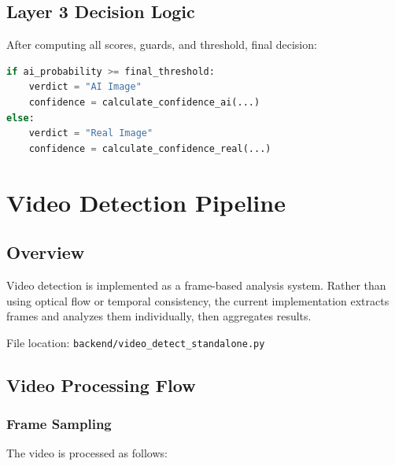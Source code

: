 \documentclass[12pt,a4paper]{book}
\begin{document}
\section{Layer 3 Decision Logic}

After computing all scores, guards, and threshold, final decision:

\begin{lstlisting}[language=Python]
if ai_probability >= final_threshold:
    verdict = "AI Image"
    confidence = calculate_confidence_ai(...)
else:
    verdict = "Real Image"
    confidence = calculate_confidence_real(...)
\end{lstlisting}

\chapter{Video Detection Pipeline}
\label{ch:video-detection}

\section{Overview}

Video detection is implemented as a frame-based analysis system. Rather than using optical flow or temporal consistency, the current implementation extracts frames and analyzes them individually, then aggregates results.

File location: \texttt{backend/video\_detect\_standalone.py}

\section{Video Processing Flow}

\subsection{Frame Sampling}

The video is processed as follows:
\end{document}
